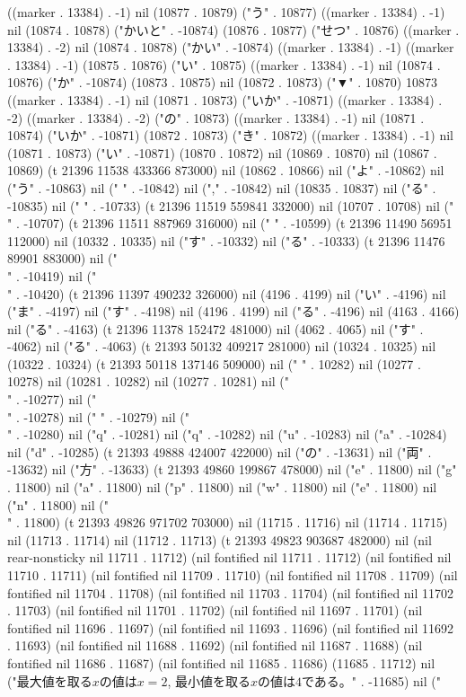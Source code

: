 ((marker . 13384) . -1) nil (10877 . 10879) ("う" . 10877) ((marker . 13384) . -1) nil (10874 . 10878) ("かいと" . -10874) (10876 . 10877) ("せつ" . 10876) ((marker . 13384) . -2) nil (10874 . 10878) ("かい" . -10874) ((marker . 13384) . -1) ((marker . 13384) . -1) (10875 . 10876) ("い" . 10875) ((marker . 13384) . -1) nil (10874 . 10876) ("か" . -10874) (10873 . 10875) nil (10872 . 10873) ("▼" . 10870) 10873 ((marker . 13384) . -1) nil (10871 . 10873) ("いか" . -10871) ((marker . 13384) . -2) ((marker . 13384) . -2) ("の" . 10873) ((marker . 13384) . -1) nil (10871 . 10874) ("いか" . -10871) (10872 . 10873) ("き" . 10872) ((marker . 13384) . -1) nil (10871 . 10873) ("い" . -10871) (10870 . 10872) nil (10869 . 10870) nil (10867 . 10869) (t 21396 11538 433366 873000) nil (10862 . 10866) nil ("よ" . -10862) nil ("う" . -10863) nil (" " . -10842) nil ("," . -10842) nil (10835 . 10837) nil ("る" . -10835) nil ("
" . -10733) (t 21396 11519 559841 332000) nil (10707 . 10708) nil ("
" . -10707) (t 21396 11511 887969 316000) nil ("
" . -10599) (t 21396 11490 56951 112000) nil (10332 . 10335) nil ("す" . -10332) nil ("る" . -10333) (t 21396 11476 89901 883000) nil ("\\" . -10419) nil ("\\" . -10420) (t 21396 11397 490232 326000) nil (4196 . 4199) nil ("い" . -4196) nil ("ま" . -4197) nil ("す" . -4198) nil (4196 . 4199) nil ("る" . -4196) nil (4163 . 4166) nil ("る" . -4163) (t 21396 11378 152472 481000) nil (4062 . 4065) nil ("す" . -4062) nil ("る" . -4063) (t 21393 50132 409217 281000) nil (10324 . 10325) nil (10322 . 10324) (t 21393 50118 137146 509000) nil ("
" . 10282) nil (10277 . 10278) nil (10281 . 10282) nil (10277 . 10281) nil ("\\" . -10277) nil ("\\" . -10278) nil ("
" . -10279) nil ("\\" . -10280) nil ("q" . -10281) nil ("q" . -10282) nil ("u" . -10283) nil ("a" . -10284) nil ("d" . -10285) (t 21393 49888 424007 422000) nil ("の" . -13631) nil ("両" . -13632) nil ("方" . -13633) (t 21393 49860 199867 478000) nil ("e" . 11800) nil ("g" . 11800) nil ("a" . 11800) nil ("p" . 11800) nil ("w" . 11800) nil ("e" . 11800) nil ("n" . 11800) nil ("\\" . 11800) (t 21393 49826 971702 703000) nil (11715 . 11716) nil (11714 . 11715) nil (11713 . 11714) nil (11712 . 11713) (t 21393 49823 903687 482000) nil (nil rear-nonsticky nil 11711 . 11712) (nil fontified nil 11711 . 11712) (nil fontified nil 11710 . 11711) (nil fontified nil 11709 . 11710) (nil fontified nil 11708 . 11709) (nil fontified nil 11704 . 11708) (nil fontified nil 11703 . 11704) (nil fontified nil 11702 . 11703) (nil fontified nil 11701 . 11702) (nil fontified nil 11697 . 11701) (nil fontified nil 11696 . 11697) (nil fontified nil 11693 . 11696) (nil fontified nil 11692 . 11693) (nil fontified nil 11688 . 11692) (nil fontified nil 11687 . 11688) (nil fontified nil 11686 . 11687) (nil fontified nil 11685 . 11686) (11685 . 11712) nil ("最大値を取る$x$の値は$x=2$, 最小値を取る$x$の値は$4$である。" . -11685) nil ("
